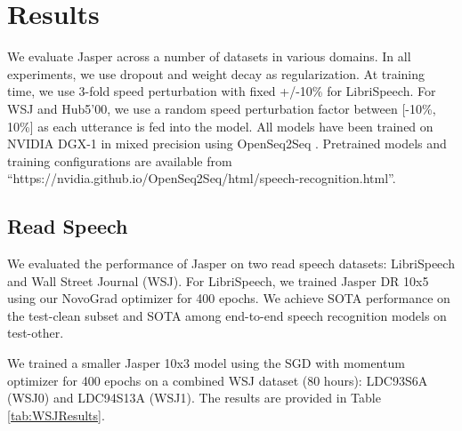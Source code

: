 \documentclass[a4paper]{article}
\begin{document}

\section{Results}
We evaluate Jasper across a number of datasets in various domains. In all experiments, we use dropout and weight decay as regularization. At training time, we use 3-fold speed perturbation with fixed +/-10\% \cite{Ko2015} for LibriSpeech. For WSJ and Hub5'00, we use a random speed perturbation factor between [-10\%, 10\%] as each utterance is fed into the model. All models have been trained on NVIDIA DGX-1 in mixed precision \cite{micikevicius2017mixed} using OpenSeq2Seq \cite{OpenSeq2Seq}. Pretrained models and training configurations are available from ``https://nvidia.github.io/OpenSeq2Seq/html/speech-recognition.html''.

\subsection{Read Speech}

We evaluated the performance of Jasper on two read speech datasets: LibriSpeech and Wall Street Journal (WSJ). For LibriSpeech, we trained Jasper DR 10x5 using our NovoGrad optimizer for 400 epochs. We achieve SOTA performance on the test-clean subset and SOTA among end-to-end speech recognition models on test-other.

We trained a smaller Jasper 10x3 model using the SGD with momentum optimizer for 400 epochs on a combined WSJ dataset (80 hours): LDC93S6A (WSJ0) and LDC94S13A (WSJ1). The results are provided in Table \ref{tab:WSJResults}.

\begin{table}[!h]
\centering
\caption{WSJ End-to-End Models, WER (\%)}
\label{tab:WSJResults}
\end{table}
\end{document}
